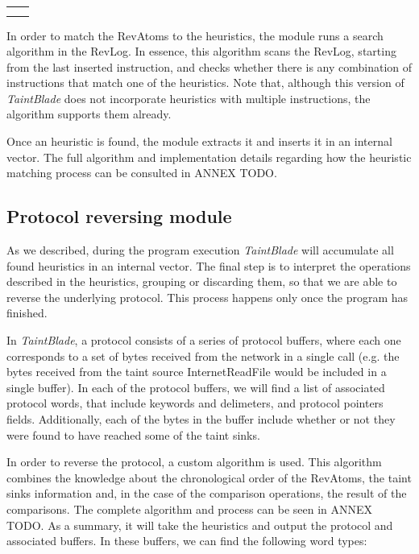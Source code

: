 \documentclass[conference]{IEEEtran}
\begin{document}
\begin{table}[htbp]
\begin{center}
\begin{tabular}{|>{\centering\arraybackslash}p{1.5cm}|>{\centering\arraybackslash}p{6.3cm}|}
                               &                                                                       \\
                               &                                                                       \\
            \hline
        \end{tabular}
        \label{tab1}
    \end{center}
    \label{table:implemented_heuristics}
\end{table}

In order to match the RevAtoms to the heuristics, the module runs a search
algorithm in the RevLog. In essence, this algorithm scans the RevLog, starting
from the last inserted instruction, and checks whether there is any combination
of instructions that match one of the heuristics. Note that, although this
version of \textit{TaintBlade} does not incorporate heuristics with multiple
instructions, the algorithm supports them already.

Once an heuristic is found, the module extracts it and inserts it in an
internal vector. The full algorithm and implementation details regarding how
the heuristic matching process can be consulted in ANNEX TODO.

\subsection{Protocol reversing module}
As we described, during the program execution \textit{TaintBlade} will
accumulate all found heuristics in an internal vector. The final step is to
interpret the operations described in the heuristics, grouping or discarding
them, so that we are able to reverse the underlying protocol. This process
happens only once the program has finished.

In \textit{TaintBlade}, a protocol consists of a series of protocol buffers,
where each one corresponds to a set of bytes received from the network in a
single call (e.g. the bytes received from the taint source InternetReadFile
would be included in a single buffer). In each of the protocol buffers, we will
find a list of associated protocol words, that include keywords and delimeters,
and protocol pointers fields. Additionally, each of the bytes in the buffer include
whether or not they were found to have reached some of the taint sinks.

In order to reverse the protocol, a custom algorithm is used. This algorithm combines
the knowledge about the chronological order of the RevAtoms, the taint sinks information and,
in the case of the comparison operations, the result of the comparisons.
The complete algorithm and process can be seen in ANNEX TODO. As a summary, it will take the 
heuristics and output the protocol and associated buffers. In these buffers, we can find the 
following word types:
\end{document}

